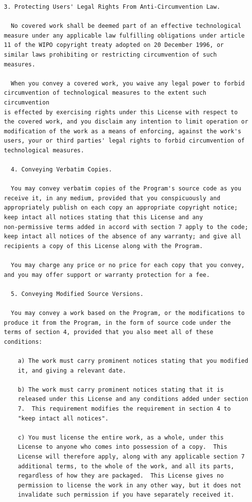 \documentclass[letterpaper,10pt,english]{sphinxmanual}
\begin{document}
\begin{Verbatim}[commandchars=\\\{\}]
  3. Protecting Users' Legal Rights From Anti-Circumvention Law.

  No covered work shall be deemed part of an effective technological
measure under any applicable law fulfilling obligations under article
11 of the WIPO copyright treaty adopted on 20 December 1996, or
similar laws prohibiting or restricting circumvention of such
measures.

  When you convey a covered work, you waive any legal power to forbid
circumvention of technological measures to the extent such circumvention
is effected by exercising rights under this License with respect to
the covered work, and you disclaim any intention to limit operation or
modification of the work as a means of enforcing, against the work's
users, your or third parties' legal rights to forbid circumvention of
technological measures.

  4. Conveying Verbatim Copies.

  You may convey verbatim copies of the Program's source code as you
receive it, in any medium, provided that you conspicuously and
appropriately publish on each copy an appropriate copyright notice;
keep intact all notices stating that this License and any
non-permissive terms added in accord with section 7 apply to the code;
keep intact all notices of the absence of any warranty; and give all
recipients a copy of this License along with the Program.

  You may charge any price or no price for each copy that you convey,
and you may offer support or warranty protection for a fee.

  5. Conveying Modified Source Versions.

  You may convey a work based on the Program, or the modifications to
produce it from the Program, in the form of source code under the
terms of section 4, provided that you also meet all of these conditions:

    a) The work must carry prominent notices stating that you modified
    it, and giving a relevant date.

    b) The work must carry prominent notices stating that it is
    released under this License and any conditions added under section
    7.  This requirement modifies the requirement in section 4 to
    "keep intact all notices".

    c) You must license the entire work, as a whole, under this
    License to anyone who comes into possession of a copy.  This
    License will therefore apply, along with any applicable section 7
    additional terms, to the whole of the work, and all its parts,
    regardless of how they are packaged.  This License gives no
    permission to license the work in any other way, but it does not
    invalidate such permission if you have separately received it.


\end{Verbatim}
\end{document}
